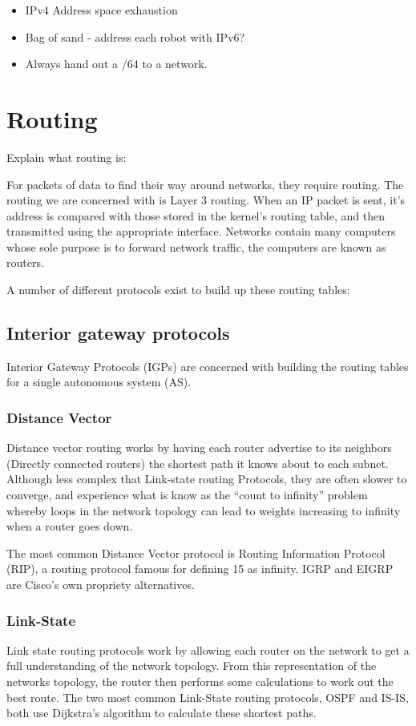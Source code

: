 \documentclass[12pt]{report}
\begin{document}
\begin{itemize}
\item IPv4 Address space exhaustion
\item Bag of sand - address each robot with IPv6?
\item Always hand out a /64 to a network.
\end{itemize}

\section{Routing}
Explain what routing is:

For packets of data to find their way around networks, they require
routing. The routing we are concerned with is Layer 3 routing. When an IP
packet is sent, it's address is compared with those stored in the kernel's
routing table, and then transmitted using the appropriate interface. Networks
contain many computers whose sole purpose is to forward network traffic, the
computers are known as routers. 

A number of different protocols exist to build up these routing tables:

\subsection{Interior gateway protocols}
Interior Gateway Protocols (IGPs) are concerned with building the routing
tables for a single autonomous system (AS). 

\subsubsection{Distance Vector}
Distance vector routing works by having each router advertise to its neighbors
(Directly connected routers) the shortest path it knows about to each subnet.
Although less complex that Link-state routing Protocols, they are often slower
to converge, and experience what is know as the ``count to infinity'' problem
whereby loops in the network topology can lead to weights increasing to
infinity when a router goes down. 

The most common Distance Vector protocol is Routing Information Protocol (RIP),
a routing protocol famous for defining 15 as infinity. IGRP and EIGRP are
Cisco's own propriety alternatives.

\subsubsection{Link-State}
Link state routing protocols work by allowing each router on the network to get
a full understanding of the network topology. From this representation of the
networks topology, the router then performs some calculations to work out the
best route. The two most common Link-State routing protocols, OSPF and IS-IS,
both use Dijkstra's algorithm to calculate these shortest paths. 
\end{document}
